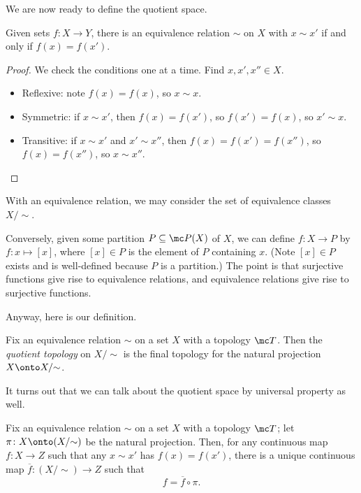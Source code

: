 \documentclass[../notes.tex]{subfiles}
\begin{document}
We are now ready to define the quotient space.
\begin{lemma}
	Given sets $f\colon X\to Y$, there is an equivalence relation $\sim$ on $X$ with $x\sim x'$ if and only if $f(x)=f(x')$.
\end{lemma}
\begin{proof}
	We check the conditions one at a time. Find $x,x',x''\in X$.
	\begin{itemize}
		\item Reflexive: note $f(x)=f(x)$, so $x\sim x$.
		\item Symmetric: if $x\sim x'$, then $f(x)=f(x')$, so $f(x')=f(x)$, so $x'\sim x$.
		\item Transitive: if $x\sim x'$ and $x'\sim x''$, then $f(x)=f(x')=f(x'')$, so $f(x)=f(x'')$, so $x\sim x''$.
		\qedhere
	\end{itemize}
\end{proof}
With an equivalence relation, we may consider the set of equivalence classes $X/{\sim}$.
\begin{remark}
	Conversely, given some partition $P\subseteq\mc P(X)$ of $X$, we can define $f\colon X\to P$ by $f\colon x\mapsto[x]$, where $[x]\in P$ is the element of $P$ containing $x$. (Note $[x]\in P$ exists and is well-defined because $P$ is a partition.) The point is that surjective functions give rise to equivalence relations, and equivalence relations give rise to surjective functions.
\end{remark}
Anyway, here is our definition.
\begin{definition}
	Fix an equivalence relation $\sim$ on a set $X$ with a topology $\mc T$. Then the \textit{quotient topology} on $X/{\sim}$ is the final topology for the natural projection $X\onto X/{\sim}$.
\end{definition}
It turns out that we can talk about the quotient space by universal property as well.
\begin{proposition} \label{prop:quotientup}
	Fix an equivalence relation $\sim$ on a set $X$ with a topology $\mc T$; let $\pi\colon X\onto(X/{\sim})$ be the natural projection. Then, for any continuous map $f\colon X\to Z$ such that any $x\sim x'$ has $f(x)=f(x')$, there is a unique continuous map $\overline f\colon(X/{\sim})\to Z$ such that
	\[f=\overline f\circ\pi.\]
\end{proposition}
\end{document}
